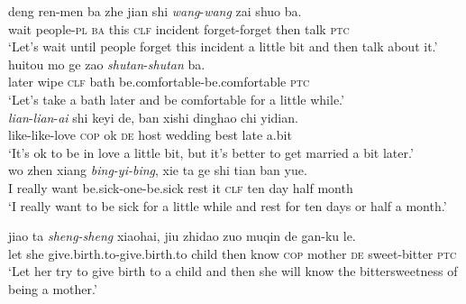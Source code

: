 \ea
\ea\label{ex:redup-achi-stat1}
\gll deng ren-men ba zhe jian shi \textit{wang}-\textit{wang} zai shuo ba.\footnotemark\\
wait people-\textsc{pl} \textsc{ba} this \textsc{clf} incident forget-forget then talk \textsc{ptc}\\
\glt `Let's wait until people forget this incident a little bit and then talk about it.'\\

\ex\label{ex:redup-achi-stat2}
\gll huitou mo ge zao \textit{shutan}-\textit{shutan} ba.\footnotemark\\
later wipe \textsc{clf} bath be.comfortable-be.comfortable \textsc{ptc}\\
\glt `Let's take a bath later and be comfortable for a little while.'\\

\ex\label{ex:redup-achi-stat3}
\gll \textit{lian}-\textit{lian}-\textit{ai} shi keyi de, ban xishi dinghao chi yidian.\footnotemark\\
like-like-love \textsc{cop} ok \textsc{de} host wedding best late a.bit\\
\glt `It's ok to be in love a little bit, but it's better to get married a bit later.'\\

\ex\label{ex:redup-achi-stat4}
\gll wo zhen xiang \textit{bing-yi-bing}, xie ta ge shi tian ban yue.\\
I really want be.sick-one-be.sick rest it \textsc{clf} ten day half month\\ 
\glt `I really want to be sick for a little while and rest for ten days or half a month.'

\ex\label{ex:redup-achi-stat5}
\gll jiao ta \textit{sheng-sheng} xiaohai, jiu zhidao zuo muqin de gan-ku le.\\
let she give.birth.to-give.birth.to child then know \textsc{cop} mother \textsc{de} sweet-bitter \textsc{ptc}\\ 
\glt `Let her try to give birth to a child and then she will know the bittersweetness of being a mother.'
\z
\z
{}


